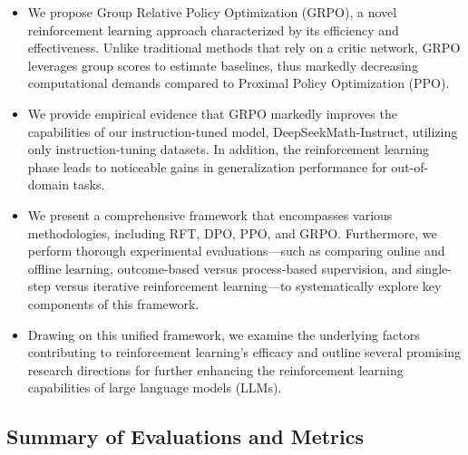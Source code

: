\begin{itemize}[topsep=0pt]
    \item We propose Group Relative Policy Optimization (GRPO), a novel reinforcement learning approach characterized by its efficiency and effectiveness. Unlike traditional methods that rely on a critic network, GRPO leverages group scores to estimate baselines, thus markedly decreasing computational demands compared to Proximal Policy Optimization (PPO).
    \item We provide empirical evidence that GRPO markedly improves the capabilities of our instruction-tuned model, DeepSeekMath-Instruct, utilizing only instruction-tuning datasets. In addition, the reinforcement learning phase leads to noticeable gains in generalization performance for out-of-domain tasks.
    \item We present a comprehensive framework that encompasses various methodologies, including RFT, DPO, PPO, and GRPO. Furthermore, we perform thorough experimental evaluations—such as comparing online and offline learning, outcome-based versus process-based supervision, and single-step versus iterative reinforcement learning—to systematically explore key components of this framework.
    \item Drawing on this unified framework, we examine the underlying factors contributing to reinforcement learning's efficacy and outline several promising research directions for further enhancing the reinforcement learning capabilities of large language models (LLMs).
\end{itemize}

\subsection{Summary of Evaluations and Metrics}

